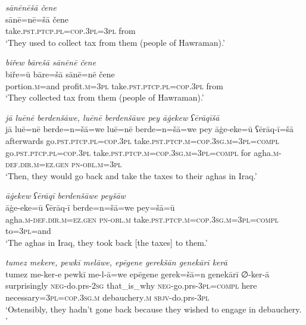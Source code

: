 \ea \label{BP.25}
\textit{sānēnēšā čene} \\ 
\gll sānē=nē=šā čene \\ 
 take\textsc{.pst}\textsc{.ptcp}\textsc{.pl}\textsc{=cop}\textsc{.3pl}\textsc{=3pl} from \\ 
\glt `They used to collect tax from them (people of Hawraman).'
\z 
 
\ea \label{BP.26}
\textit{biřew bārešā sānēnē čene} \\ 
\gll biře=ū bāre=šā sānē=nē čene \\ 
 portion\textsc{.m}=and profit\textsc{.m}\textsc{=3pl} take\textsc{.pst}\textsc{.ptcp}\textsc{.pl}\textsc{=cop}\textsc{.3pl} from \\ 
\glt `They collected tax from them (people of Hawraman).'
\z 
 
\ea \label{BP.27}
\textit{jā luēnē berdenšāwe, luēnē berdenšāwe pey āġekew ʕērāqīšā} \\ 
\gll jā luē=nē berde=n=šā=we luē=nē berde=n=šā=we pey āġe-eke=ū ʕērāq-ī=šā \\ 
 afterwards go\textsc{.pst}\textsc{.ptcp}\textsc{.pl}\textsc{=cop}\textsc{.3pl} take\textsc{.pst}\textsc{.ptcp}\textsc{.m}\textsc{=cop}\textsc{.3sg}\textsc{.m}\textsc{=3pl}\textsc{=compl} go\textsc{.pst}\textsc{.ptcp}\textsc{.pl}\textsc{=cop}\textsc{.3pl} take\textsc{.pst}\textsc{.ptcp}\textsc{.m}\textsc{=cop}\textsc{.3sg}\textsc{.m}\textsc{=3pl}\textsc{=compl} for agha\textsc{.m}\textsc{-def}\textsc{.dir}\textsc{.m}\textsc{=ez.gen} \textsc{pn}\textsc{-obl}\textsc{.m}\textsc{=3pl} \\ 
\glt `Then, they would go back and take the taxes to their aghas in Iraq.'
\z 
 
\ea \label{BP.28}
\textit{āġekew ʕērāqī berdenšāwe peyšāw} \\ 
\gll āġe-eke=ū ʕērāq-ī berde=n=šā=we pey=šā=ū \\ 
 agha\textsc{.m}\textsc{-def}\textsc{.dir}\textsc{.m}\textsc{=ez.gen} \textsc{pn}\textsc{-obl}\textsc{.m} take\textsc{.pst}\textsc{.ptcp}\textsc{.m}\textsc{=cop}\textsc{.3sg}\textsc{.m}\textsc{=3pl}\textsc{=compl} to\textsc{=3pl}=and \\ 
\glt `The aghas in Iraq, they took back [the taxes] to them.'
\z 
 
\ea \label{BP.34}
\textit{tumez mekere, pewkī melāwe, epēgene gerekšān genekārī kerā} \\ 
\gll tumez me-ker-e pewkī me-l-ā=we epēgene gerek=šā=n genekārī ∅-ker-ā \\ 
 surprisingly \textsc{neg-}do.prs-\textsc{2sg} that\_is\_why \textsc{neg-}go.prs\textsc{-3pl}\textsc{=compl} here necessary\textsc{=3pl}\textsc{=cop}\textsc{.3sg}\textsc{.m} debauchery\textsc{.m} \textsc{sbjv-}do.prs\textsc{-3pl} \\ 
\glt `Ostensibly, they hadn’t gone back because they wished to engage in debauchery. '
\z 
 
